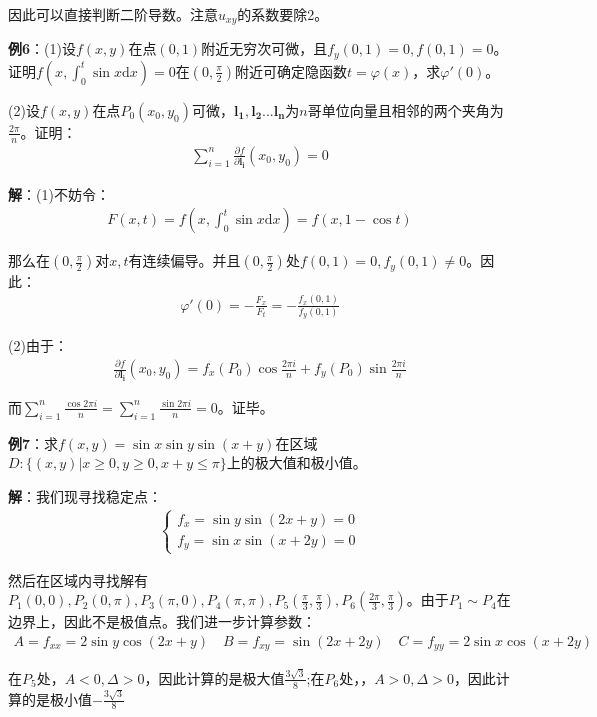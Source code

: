 \documentclass{ctexart}
\let\oldtextbf\textbf %
\renewcommand{\textbf}[1]{\textcolor{btex}{\oldtextbf{#1}}} %
\begin{document}
因此可以直接判断二阶导数。注意$u_{xy}$的系数要除2。

\textbf{例6}：(1)设$f(x,y)$在点$(0,1)$附近无穷次可微，且$f_y(0,1)=0,f(0,1)=0$。证明$f(x,\int_0^t \sin x\mathrm{d}x)=0$在$(0,\frac{\pi}{2})$附近可确定隐函数$t=\varphi(x)$，求$\varphi'(0)$。

(2)设$f(x,y)$在点$P_0(x_0,y_0)$可微，$\bm{l_1},\bm{l_2}...\bm{l_n}$为$n$哥单位向量且相邻的两个夹角为$\frac{2\pi}{n}$。证明：
\begin{align*}
    \sum_{i=1}^n\frac{\partial f}{\partial\bm{l_i}}(x_0,y_0)=0
\end{align*}

\textbf{解}：(1)不妨令：
\begin{align*}
    F(x,t)=f(x,\int_0^t\sin x\mathrm{d}x)=f(x,1-\cos t)
\end{align*}

那么在$(0,\frac{\pi}{2})$对$x,t$有连续偏导。并且$(0,\frac{\pi}{2})$处$f(0,1)=0,f_y(0,1)\neq 0$。因此：
\begin{align*}
    \varphi'(0)=-\frac{F_x}{F_t}=-\frac{f_x(0,1)}{f_y(0,1)}
\end{align*}

(2)由于：
\begin{align*}
\frac{\partial f}{\partial\bm{l_i}}(x_0,y_0)=f_x(P_0)\cos\frac{2\pi i}{n}+f_y(P_0)\sin\frac{2\pi i}{n}          
\end{align*}

而$\sum_{i=1}^n\frac{\cos 2\pi i}{n}= \sum_{i=1}^n\frac{\sin 2\pi i}{n}=0$。证毕。

\textbf{例7}：求$f(x,y)=\sin x\sin y\sin(x+y)$在区域$D:\{(x,y)|x\geq 0,y\geq 0,x+y\leq \pi\}$上的极大值和极小值。

\textbf{解}：我们现寻找稳定点：
\begin{align*}
\begin{cases}
f_x=\sin y\sin(2x+y)=0\\
f_y=\sin x\sin(x+2y)=0
\end{cases}
\end{align*}

然后在区域内寻找解有$P_1(0,0),P_2(0,\pi),P_3(\pi,0),P_4(\pi,\pi),P_5(\frac{\pi}{3},\frac{\pi}{3}),P_6(\frac{2\pi}{3},\frac{\pi}{3})$。由于$P_1\sim P_4$在边界上，因此不是极值点。我们进一步计算参数：
\begin{align*}
    A=f_{xx}=2\sin y\cos(2x+y)\quad B=f_{xy}=\sin(2x+2y)\quad C=f_{yy}=2\sin x\cos(x+2y)
\end{align*}

在$P_5$处，$A<0,\Delta>0$，因此计算的是极大值$\frac{3\sqrt{3}}{8}$;在$P_6$处，，$A>0,\Delta>0$，因此计算的是极小值$-\frac{3\sqrt{3}}{8}$
\end{document}
